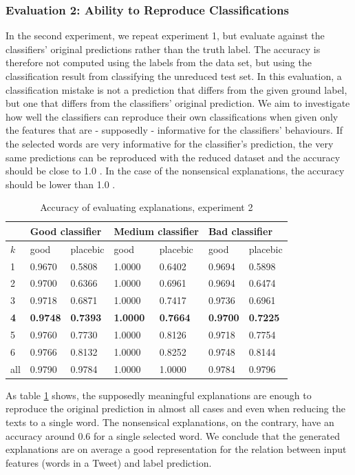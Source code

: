 \subsubsection{Evaluation 2: Ability to Reproduce Classifications}
In the second experiment, we repeat experiment 1, but evaluate against the classifiers' original predictions rather than the truth label. The accuracy is therefore not computed using the labels from the data set, but using the classification result from classifying the unreduced test set. In this evaluation, a classification mistake is not a prediction that differs from the given ground label, but one that differs from the classifiers' original prediction. We aim to investigate how well the classifiers can reproduce their own classifications when given only the features that are - supposedly - informative for the classifiers' behaviours. If the selected words are very informative for the classifier's prediction, the very same predictions can be reproduced with the reduced dataset and the accuracy should be close to 1.0 . In the case of the nonsensical explanations, the accuracy should be lower than 1.0 .\newline
\begin{table}[H]
	\centering
	\begin{tabular}{l|m{1.4cm}m{1.4cm}|m{1.4cm}m{1.4cm}|m{1.4cm}m{1.4cm}}
		& \multicolumn{2}{l|}{\textbf{Good classifier}} & \multicolumn{2}{l|}{\textbf{Medium classifier}} & \multicolumn{2}{l}{\textbf{Bad classifier}} \\ \midrule
		$k$& good & placebic & good & placebic & good & placebic \\ \midrule
		1  &  0.9670  &  0.5808 & 1.0000 & 0.6402 & 0.9694  &  0.5898  \\
		2  &  0.9700  &  0.6366 & 1.0000 & 0.6961 & 0.9694  &  0.6474  \\
		3  &  0.9718  &  0.6871 & 1.0000 & 0.7417 & 0.9736  &  0.6961  \\
		\textbf{4}  &  \textbf{0.9748}  &  \textbf{0.7393} & \textbf{1.0000} & \textbf{0.7664} & \textbf{0.9700}  &  \textbf{0.7225}  \\
		5  &  0.9760  &  0.7730 & 1.0000 & 0.8126 & 0.9718  &  0.7754  \\
		6  &  0.9766  &  0.8132 & 1.0000 & 0.8252 & 0.9748  &  0.8144  \\
		all  &  0.9790  &  0.9784 & 1.0000 & 1.0000 & 0.9784  &  0.9796  \\\bottomrule
	\end{tabular}
	\caption{Accuracy of evaluating explanations, experiment 2}
	\label{tab:exp2}
\end{table}
\noindent As table \ref{tab:exp2} shows, the supposedly meaningful explanations are enough to reproduce the original prediction in almost all cases and even when reducing the texts to a single word. The nonsensical explanations, on the contrary, have an accuracy around 0.6 for a single selected word. We conclude that the generated explanations are on average a good representation for the relation between input features (words in a Tweet) and label prediction.


